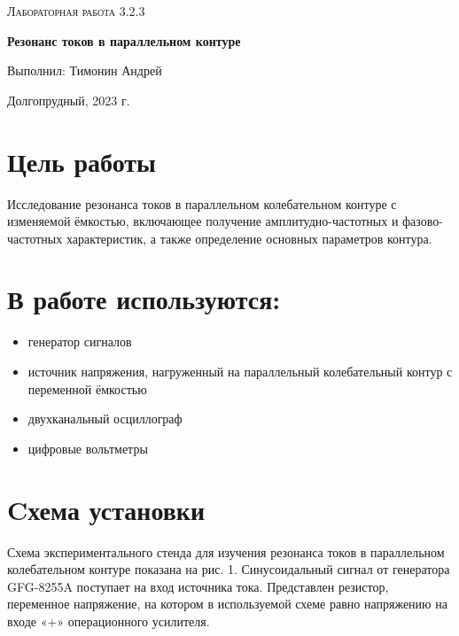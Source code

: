 \documentclass[a4paper]{article}
\begin{document}
\begin{titlepage}
	\centering
	\vspace{5cm}
	\vspace{4cm}
	{\scshape\Large Лабораторная работа 3.2.3\par}
	\vspace{1cm}
	{\huge\bfseries Резонанс токов в параллельном контуре\par}
	\vspace{1cm}
	\vfill
\begin{flushright}
	\vspace{0.3cm}
	{\LARGE Выполнил: Тимонин Андрей}
\end{flushright}
	

	\vfill

	Долгопрудный, 2023 г.
\end{titlepage}

\section{Цель работы}

Исследование резонанса токов в параллельном колебательном контуре с изменяемой ёмкостью, включающее получение амплитудно-частотных и фазово-частотных характеристик, а также определение основных параметров контура.

\section{В работе используются:}
\begin{itemize}
    \item генератор сигналов
    \item источник напряжения, нагруженный на параллельный колебательный контур с переменной ёмкостью
    \item двухканальный осциллограф
    \item цифровые вольтметры
\end{itemize}


\section{Cхема установки}

Схема экспериментального стенда для изучения резонанса токов в параллельном колебательном контуре показана на рис. 1. Синусоидальный сигнал от генератора GFG-8255A поступает на вход источника тока. Представлен резистор, переменное напряжение, на котором в используемой схеме равно напряжению на входе «+» операционного усилителя. \\
\end{document}
